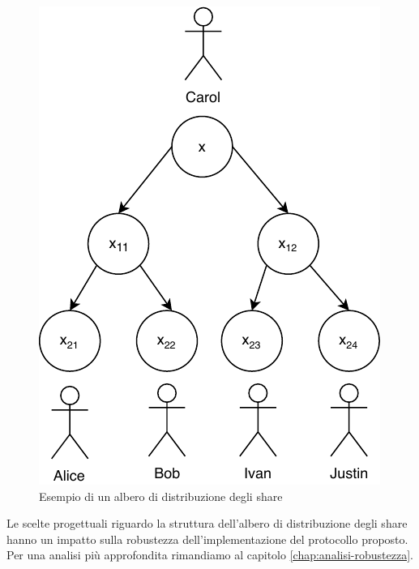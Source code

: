 \begin{figure}[H]
	\centering
	\includegraphics[width=0.45\linewidth]{images/chap_protocollo/protocollo-gerarchia.pdf}
	\caption{Esempio di un albero di distribuzione degli share}
\end{figure}

Le scelte progettuali riguardo la struttura dell'albero di distribuzione degli share hanno un
impatto sulla robustezza dell'implementazione del protocollo proposto. Per una analisi più
approfondita rimandiamo al capitolo \ref{chap:analisi-robustezza}.

